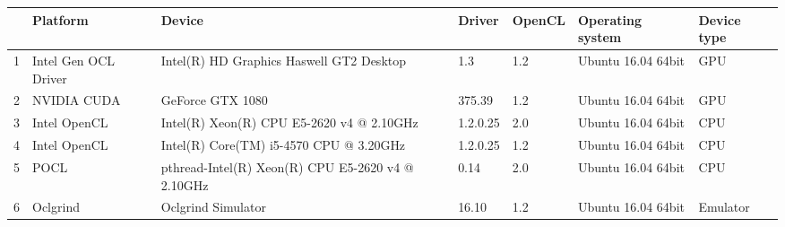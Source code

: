 \begin{tabular}{lllllll}
\toprule
{} &              Platform &                                             Device &    Driver & OpenCL &    Operating system & Device type \\
\midrule
1 &  Intel Gen OCL Driver &           Intel(R) HD Graphics Haswell GT2 Desktop &       1.3 &    1.2 &  Ubuntu 16.04 64bit &         GPU \\
2 &           NVIDIA CUDA &                                   GeForce GTX 1080 &    375.39 &    1.2 &  Ubuntu 16.04 64bit &         GPU \\
3 &          Intel OpenCL &          Intel(R) Xeon(R) CPU E5-2620 v4 @ 2.10GHz &  1.2.0.25 &    2.0 &  Ubuntu 16.04 64bit &         CPU \\
4 &          Intel OpenCL &            Intel(R) Core(TM) i5-4570 CPU @ 3.20GHz &  1.2.0.25 &    1.2 &  Ubuntu 16.04 64bit &         CPU \\
5 &                  POCL &  pthread-Intel(R) Xeon(R) CPU E5-2620 v4 @ 2.10GHz &      0.14 &    2.0 &  Ubuntu 16.04 64bit &         CPU \\
6 &              Oclgrind &                                 Oclgrind Simulator &     16.10 &    1.2 &  Ubuntu 16.04 64bit &    Emulator \\
\bottomrule
\end{tabular}
